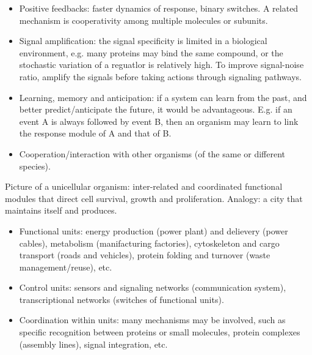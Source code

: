 \documentclass{report}
\begin{document}
\begin{itemize}
\item Positive feedbacks: faster dynamics of response, binary switches. A related mechanism is cooperativity among multiple molecules or subunits. 

\item Signal amplification: the signal specificity is limited in a biological environment, e.g. many proteins may bind the same compound, or the stochastic variation of a reguatlor is relatively high. To improve signal-noise ratio, amplify the signals before taking actions through signaling pathways. 

\item Learning, memory and anticipation: if a system can learn from the past, and better predict/anticipate the future, it would be advantageous. E.g. if an event A is always followed by event B, then an organism may learn to link the response module of A and that of B. 

\item Cooperation/interaction with other organisms (of the same or different species). 

\end{itemize}

Picture of a unicellular organism: inter-related and coordinated functional modules that direct cell survival, growth and proliferation. Analogy: a city that maintains itself and produces. 
\begin{itemize}
	\item Functional units: energy production (power plant) and delievery (power cables), metabolism (manifacturing factories), cytoskeleton and cargo transport (roads and vehicles), protein folding and turnover (waste management/reuse), etc. 
	\item Control units: sensors and signaling networks (communication system), transcriptional networks (switches of functional units). 
	\item Coordination within units: many mechanisms may be involved, such as specific recognition between proteins or small molecules, protein complexes (assembly lines), signal integration, etc. 
\end{itemize}
\end{document}
